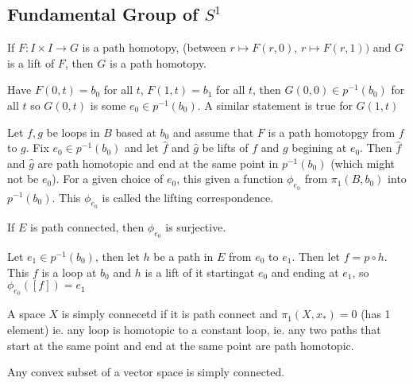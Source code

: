 
\subsection{Fundamental Group of $S^1$ }

\begin{theorem}
    If $F: I \times I \to G$ is a path homotopy, (between $r \mapsto F(r,0)$, $r \mapsto F(r,1))$ and $G$ is a lift of $F$, then $G$ is a path homotopy. 
\end{theorem}

\begin{pf}
    Have $F(0,t) = b_0$ for all $t$, $F(1,t) =b_1$ for all $t$, then $G(0,0) \in p^{-1}(b_0)$ for all $t$ so $G(0,t)$ is some $e_0 \in p^{-1}(b_0)$. A similar statement is true for $G(1,t)$ 
\end{pf}    

\begin{corollary}
    Let $f,g$ be loops in $B$ based at $b_0$ and assume that $F$ is a path homotopgy from $f$ to $g$. Fix $e_0 \in p^{-1}(b_0)$ and let $\hat{f}$ and $\hat{g}$ be lifts of $f$ and $g$ begining at $e_0$. Then $\hat{f}$ and $\hat{g}$ are path homotopic and end at the same point in $p^{-1}(b_0)$ (which might not be $e_0$). For a given choice of $e_0$, this given a function $\phi_{e_0}$ from $\pi_1(B, b_0)$ into $p^{-1}(b_0)$. This $\phi_{e_0}$ is called the lifting correspondence. 
\end{corollary}

\begin{proposition}
    If $E$ is path connected, then $\phi_{e_0}$ is surjective. 
\end{proposition}

\begin{pf}
    Let $e_1 \in p^{-1}(b_0)$, then let $h$ be a path in $E$ from $e_0$ to $e_1$. Then let $f = p \circ h$. This $f$ is a loop at $b_0$ and $h$ is a lift of it startingat $e_0$ and ending at $e_1$, so $\phi_{e_0}([f])=e_1$ 
\end{pf}

\begin{definition}
    A space $X$ is simply connecetd if it is path connect and $\pi_1(X, x_*) = 0$ (has 1 element) ie. any loop is homotopic to a constant loop, ie. any two paths that start at the same point and end at the same point are path homotopic. 
\end{definition}

\noindent
Any convex subset of a vector space is simply connected. 

